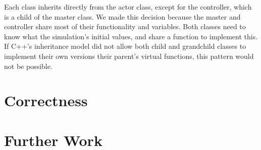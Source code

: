 \documentclass[oneside]{article}
\begin{document}
Each class inherits directly from the actor class, except for the controller, which is a child of the master class. We made this decision because the master and controller share most of their functionality and variables. Both classes need to know what the simulation's initial values, and share a function to implement this. If C++'s inheritance model did not allow both child and grandchild classes to implement their own versions their parent's virtual functions, this pattern would not be possible.

\section{Correctness}\label{sec:cor}

\section{Further Work}\label{sec:fur}
\end{document}

